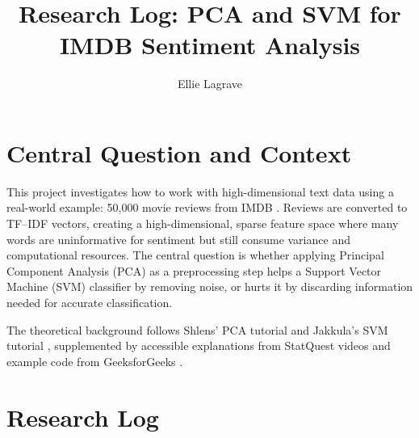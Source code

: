 \documentclass[runningheads]{llncs}
\begin{document}
\title{Research Log: PCA and SVM for IMDB Sentiment Analysis}
\author{Ellie Lagrave}
\maketitle

\section*{Central Question and Context}

This project investigates how to work with high-dimensional text data using a real-world example: 50,000 movie reviews from IMDB \cite{maas2011imdb}. Reviews are converted to TF--IDF vectors, creating a high-dimensional, sparse feature space where many words are uninformative for sentiment but still consume variance and computational resources. The central question is whether applying Principal Component Analysis (PCA) as a preprocessing step helps a Support Vector Machine (SVM) classifier by removing noise, or hurts it by discarding information needed for accurate classification.

The theoretical background follows Shlens' PCA tutorial \cite{shlens2014tutorial} and Jakkula's SVM tutorial \cite{jakkula2011svm}, supplemented by accessible explanations from StatQuest videos \cite{starmer2017pca, starmer2018svm1, starmer2018svm2, starmer2018svm3} and  example code from GeeksforGeeks \cite{geeksforgeeks_pca,geeksforgeeks_svm}.

\section*{Research Log}
\end{document}
